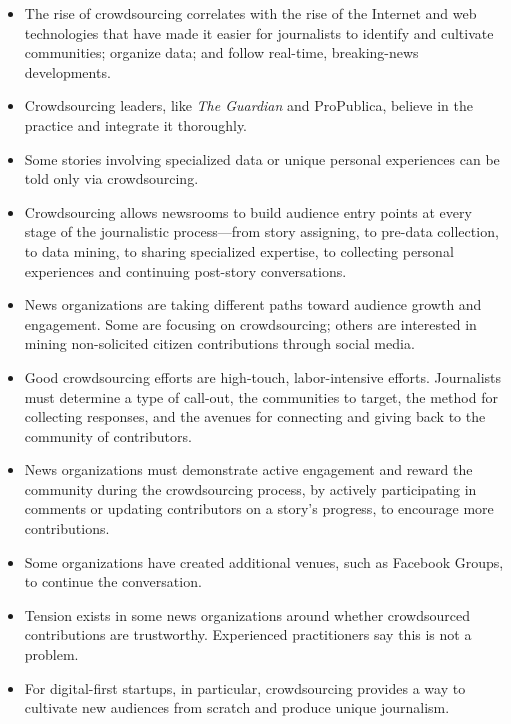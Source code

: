 \documentclass[notoc, symmetric, nobib, nols]{towcenter-guideto-book}
\begin{document}
\begin{itemize}
\item The rise of crowdsourcing correlates with the rise of the Internet and web technologies that have made it easier for journalists to identify and cultivate communities; organize data; and follow real-time, breaking-news developments.

\item Crowdsourcing leaders, like \textit{The Guardian} and ProPublica, believe in the practice and integrate it thoroughly.

\item Some stories involving specialized data or unique personal experiences can be told only via crowdsourcing. 

\item Crowdsourcing allows newsrooms to build audience entry points at every stage of the journalistic process---from story assigning, to pre-data collection, to data mining, to sharing specialized expertise, to collecting personal experiences and continuing post-story conversations.
 
\item News organizations are taking different paths toward audience growth and engagement. Some are focusing on crowdsourcing; others are interested in mining non-solicited citizen contributions through social media.

\item Good crowdsourcing efforts are high-touch, labor-intensive efforts. Journalists must determine a type of call-out, the communities to target, the method for collecting responses, and the avenues for connecting and giving back to the community of contributors. 

\item News organizations must demonstrate active engagement and reward the community during the crowdsourcing process, by actively participating in comments or updating contributors on a story's progress, to encourage more contributions.

\item Some organizations have created additional venues, such as Facebook Groups, to continue the conversation.

\item Tension exists in some news organizations around whether crowdsourced contributions are trustworthy. Experienced practitioners say this is not a problem. 

\item For digital-first startups, in particular, crowdsourcing provides a way to cultivate new audiences from scratch and produce unique journalism. 


\end{itemize}
\end{document}
